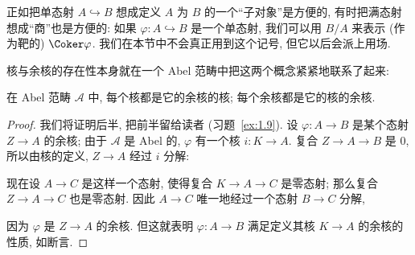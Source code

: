 \begin{remark}\label{rmk:epi-quotient}
正如把单态射 $A\hookrightarrow B$ 想成定义 $A$ 为 $B$ 的一个``子对象''是方便的, 有时把满态射想成``商''也是方便的: 如果 $\varphi:A\hookrightarrow B$ 是一个单态射, 我们可以用 $B/A$ 来表示 (作为靶的) $\Coker\varphi$. 我们在本节中不会真正用到这个记号, 但它以后会派上用场.
\end{remark}

\indent 核与余核的存在性本身就在一个 Abel 范畴中把这两个概念紧紧地联系了起来:

\begin{lemma}\label{lem:kernel-of-cokernel}
在 Abel 范畴 $\mathcal{A}$ 中, 每个核都是它的余核的核; 每个余核都是它的核的余核.
\end{lemma}

\begin{proof}
我们将证明后半, 把前半留给读者 (习题~\ref{ex:1.9}).
设 $\varphi:A\to B$ 是某个态射 $Z\to A$ 的余核; 由于 $\mathcal{A}$ 是 Abel 的, $\varphi$ 有一个核 $i:K\to A$. 复合 $Z\to A\to B$ 是 $0$, 所以由核的定义, $Z\to A$ 经过 $i$ 分解:
\begin{center}
\end{center}
现在设 $A\to C$ 是这样一个态射, 使得复合 $K\to A\to C$ 是零态射; 那么复合 $Z\to A\to C$ 也是零态射. 因此 $A\to C$ 唯一地经过一个态射 $B\to C$ 分解,
\begin{center}
\end{center}
因为 $\varphi$ 是 $Z\to A$ 的余核. 但这就表明 $\varphi:A\to B$ 满足定义其核 $K\to A$ 的余核的性质, 如断言.
\end{proof}


